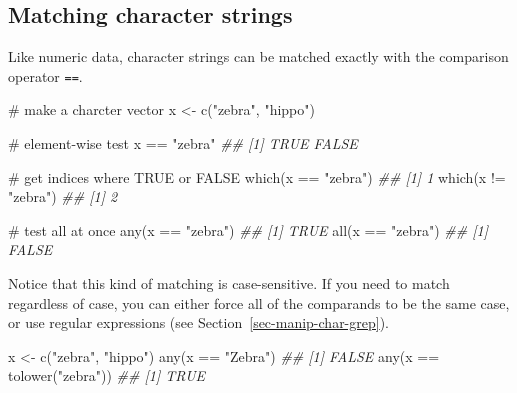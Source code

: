 \documentclass[
  13,
  letterpaper,
]{report}
\newenvironment{Shaded}{\begin{snugshade}}{\end{snugshade}}
\newcommand{\CommentTok}[1]{\textcolor[rgb]{0.37,0.37,0.37}{#1}}
\newcommand{\DocumentationTok}[1]{\textcolor[rgb]{0.37,0.37,0.37}{\textit{#1}}}
\newcommand{\FunctionTok}[1]{\textcolor[rgb]{0.28,0.35,0.67}{#1}}
\newcommand{\NormalTok}[1]{\textcolor[rgb]{0.00,0.23,0.31}{#1}}
\newcommand{\OtherTok}[1]{\textcolor[rgb]{0.00,0.23,0.31}{#1}}
\newcommand{\SpecialCharTok}[1]{\textcolor[rgb]{0.37,0.37,0.37}{#1}}
\newcommand{\StringTok}[1]{\textcolor[rgb]{0.13,0.47,0.30}{#1}}
\begin{document}
\subsection{Matching character strings}\label{sec-manip-char-match}

Like numeric data, character strings can be matched exactly with the
comparison operator \texttt{==}.

\begin{Shaded}
\begin{Highlighting}[]
\CommentTok{\# make a charcter vector}
\NormalTok{x }\OtherTok{\textless{}{-}} \FunctionTok{c}\NormalTok{(}\StringTok{"zebra"}\NormalTok{, }\StringTok{"hippo"}\NormalTok{)}

\CommentTok{\# element{-}wise test}
\NormalTok{x }\SpecialCharTok{==} \StringTok{"zebra"}
\DocumentationTok{\#\# [1]  TRUE FALSE}

\CommentTok{\# get indices where TRUE or FALSE}
\FunctionTok{which}\NormalTok{(x }\SpecialCharTok{==} \StringTok{"zebra"}\NormalTok{)}
\DocumentationTok{\#\# [1] 1}
\FunctionTok{which}\NormalTok{(x }\SpecialCharTok{!=} \StringTok{"zebra"}\NormalTok{)}
\DocumentationTok{\#\# [1] 2}

\CommentTok{\# test all at once}
\FunctionTok{any}\NormalTok{(x }\SpecialCharTok{==} \StringTok{"zebra"}\NormalTok{)}
\DocumentationTok{\#\# [1] TRUE}
\FunctionTok{all}\NormalTok{(x }\SpecialCharTok{==} \StringTok{"zebra"}\NormalTok{)}
\DocumentationTok{\#\# [1] FALSE}
\end{Highlighting}
\end{Shaded}

Notice that this kind of matching is case-sensitive. If you need to
match regardless of case, you can either force all of the comparands to
be the same case, or use regular expressions (see
Section~\ref{sec-manip-char-grep}).

\begin{Shaded}
\begin{Highlighting}[]

\NormalTok{x }\OtherTok{\textless{}{-}} \FunctionTok{c}\NormalTok{(}\StringTok{"zebra"}\NormalTok{, }\StringTok{"hippo"}\NormalTok{)}
\FunctionTok{any}\NormalTok{(x }\SpecialCharTok{==} \StringTok{"Zebra"}\NormalTok{)}
\DocumentationTok{\#\# [1] FALSE}
\FunctionTok{any}\NormalTok{(x }\SpecialCharTok{==} \FunctionTok{tolower}\NormalTok{(}\StringTok{"zebra"}\NormalTok{))}
\DocumentationTok{\#\# [1] TRUE}
\end{Highlighting}
\end{Shaded}
\end{document}
